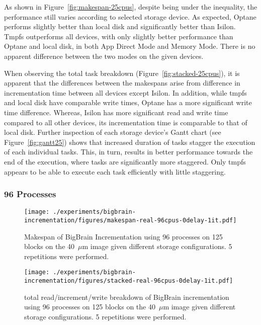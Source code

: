 \documentclass[conference]{IEEEtran}
\newcommand{\bigbrain}{BigBrain\xspace}
\begin{document}
As shown in Figure~\ref{fig:makespan-25cpus}, despite being under the inequality, the
performance still varies according to selected storage device. As expected, Optane performs
slightly better than local disk and significantly better than Isilon. Tmpfs outperforms all
devices, with only slightly better performance than Optane and local disk, in both App Direct Mode and Memory Mode.
There is no apparent difference between the two modes on the given devices.

When observing the total task breakdown (Figure~\ref{fig:stacked-25cpus}), it is
apparent that the differences between the makespans arise from difference in incrementation
time between all devices except Isilon. In addition, while tmpfs and local disk have comparable write times, Optane
has a more significant write time difference. Whereas, Isilon has more significant read and
write time compared to all other devices, its incrementation time is comparable to that
of local disk. Further inspection of each storage device's Gantt chart (see Figure~\ref{fig:gantt25})
shows that increased duration of tasks stagger the execution of each individual tasks. This, in turn,
results in better performance towards the end of the execution, where tasks are significantly more staggered.
Only tmpfs appears to be able to execute each task efficiently with little staggering.
\subsubsection{96 Processes}
\begin{figure}
    \texttt{[image: ./experiments/bigbrain-incrementation/figures/makespan-real-96cpus-0delay-1it.pdf]}
    \captionsetup{width=\columnwidth}
    \caption{Makespan of \bigbrain Incrementation using 96 processes on 125 blocks on the 40~$\mu$m image given different storage configurations. 5 repetitions were performed.}\label{fig:makespan-96cpus}
\end{figure}
\begin{figure}
    \texttt{[image: ./experiments/bigbrain-incrementation/figures/stacked-real-96cpus-0delay-1it.pdf]}
    \captionsetup{width=\columnwidth}
    \caption{total read/increment/write breakdown of \bigbrain incrementation using 96 processes on 125 blocks on the 40~$\mu$m image given different storage configurations. 5 repetitions were performed.}\label{fig:stacked-96cpus}
\end{figure}
\end{document}
